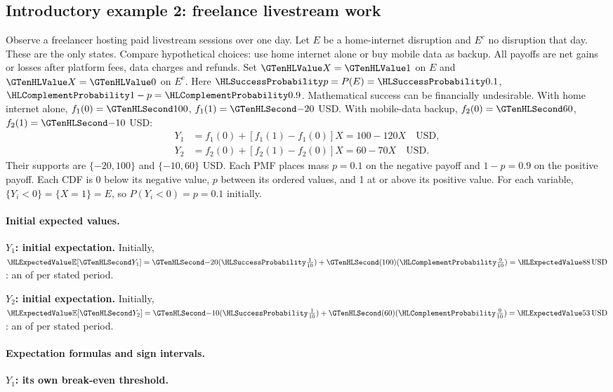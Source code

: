 \subsection{Introductory example 2: freelance livestream work}\label{ex:intro-two}
Observe a freelancer hosting paid livestream sessions over one day. Let $E$ be a home-internet disruption
and $E^c$ no disruption that day. These are the only states. Compare hypothetical choices:
use home internet alone or buy mobile data as backup. All payoffs are net gains or losses
after platform fees, data charges and refunds. Set $\Indicator{X}=\Indicator{1}$ on $E$ and
$\Indicator{X}=\Indicator{0}$ on $E^c$. Here $\SuccessProb{p}=P(E)=\SuccessProb{0.1}$,
$\FailureProb{1-p}=\FailureProb{0.9}$. Mathematical success can be financially undesirable.
With home internet alone, $f_1(0)=\Money{100}$, $f_1(1)=\Money{-20}$ USD.
With mobile-data backup, $f_2(0)=\Money{60}$, $f_2(1)=\Money{-10}$ USD:
\[
\begin{aligned}
Y_1&=f_1(0)+[f_1(1)-f_1(0)]X=100-120X\quad\text{USD},\\
Y_2&=f_2(0)+[f_2(1)-f_2(0)]X=60-70X\quad\text{USD}.
\end{aligned}
\]
Their supports are $\{-20,100\}$ and $\{-10,60\}$ USD. Each PMF places
mass $p=0.1$ on the negative payoff and $1-p=0.9$ on the positive payoff.
Each CDF is 0 below its negative value, $p$ between its ordered values,
and 1 at or above its positive value. For each variable,
$\{Y_i<0\}=\{X=1\}=E$, so $P(Y_i<0)=p=0.1$ initially.
\paragraph{Initial expected values.}
\textbf{$Y_1$: initial expectation.}
Initially, $\ExpectedValue{\mathbb E}[\Money{Y_1}]=\Money{-20}(\SuccessProb{\frac{1}{10}})+\Money{(100)}(\FailureProb{\frac{9}{10}})=\ExpectedValue{88\,\text{USD}}$:
an  of  per stated period.

\textbf{$Y_2$: initial expectation.}
Initially, $\ExpectedValue{\mathbb E}[\Money{Y_2}]=\Money{-10}(\SuccessProb{\frac{1}{10}})+\Money{(60)}(\FailureProb{\frac{9}{10}})=\ExpectedValue{53\,\text{USD}}$:
an  of  per stated period.
\paragraph{Expectation formulas and sign intervals.}
\textbf{$Y_1$: its own break-even threshold.}

